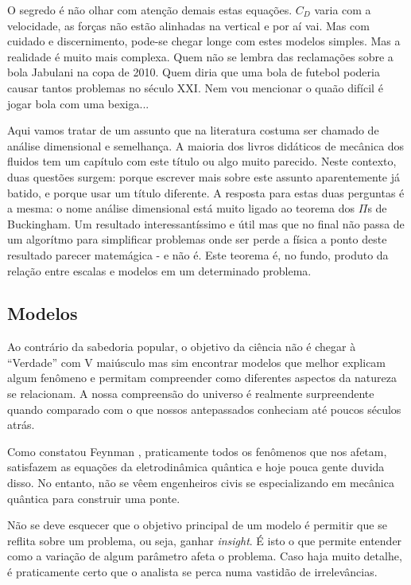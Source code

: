 \documentclass[article,12pt,oneside,a4paper,english,brazil,sumario=tradicional]{abntex2}
\begin{document}
O segredo é não olhar com atenção demais estas equações. $C_D$ varia com a velocidade, as forças não estão alinhadas na vertical e por aí vai. Mas com cuidado e discernimento, pode-se chegar longe com estes modelos simples. Mas a realidade é muito mais complexa. Quem não se lembra das reclamações sobre a bola Jabulani na copa de 2010. Quem diria que uma bola de futebol poderia causar tantos problemas no século XXI. Nem vou mencionar o quaão difícil é jogar bola com uma bexiga...



Aqui vamos tratar de um assunto que na literatura costuma ser chamado de análise dimensional e semelhança. A maioria dos livros didáticos de mecânica dos fluidos tem um capítulo com este título ou algo muito parecido. Neste contexto, duas questões surgem: porque escrever mais sobre este assunto aparentemente já batido, e porque usar um título diferente. A resposta para estas duas perguntas é a mesma: o nome análise dimensional está muito ligado ao teorema dos $\Pi$s de Buckingham. Um resultado interessantíssimo e útil mas que no final não passa de um algorítmo para simplificar problemas onde ser perde a física a ponto deste resultado parecer matemágica - e não é. Este teorema é, no fundo, produto da relação entre escalas e modelos em um determinado problema.

\subsection{Modelos}
 Ao contrário da sabedoria popular, o objetivo da ciência não é chegar à ``Verdade'' com V maiúsculo mas sim encontrar modelos que melhor explicam algum fenômeno e permitam compreender como diferentes aspectos da natureza se relacionam. A nossa compreensão do universo é realmente surpreendente quando comparado com o que nossos antepassados conheciam até poucos séculos atrás. 

Como constatou Feynman \cite{Feynman14}, praticamente todos os fenômenos que nos afetam, satisfazem as equações da eletrodinâmica quântica e hoje pouca gente duvida disso. No entanto, não se vêem engenheiros civis se especializando em mecânica quântica para construir uma ponte. 

Não se deve esquecer que o objetivo principal de um modelo é permitir que se reflita sobre um problema, ou seja, ganhar \emph{insight}. É isto o que permite entender como a variação de algum parâmetro afeta o problema. Caso haja muito detalhe, é praticamente certo que o analista se perca numa vastidão de irrelevâncias.
\end{document}
